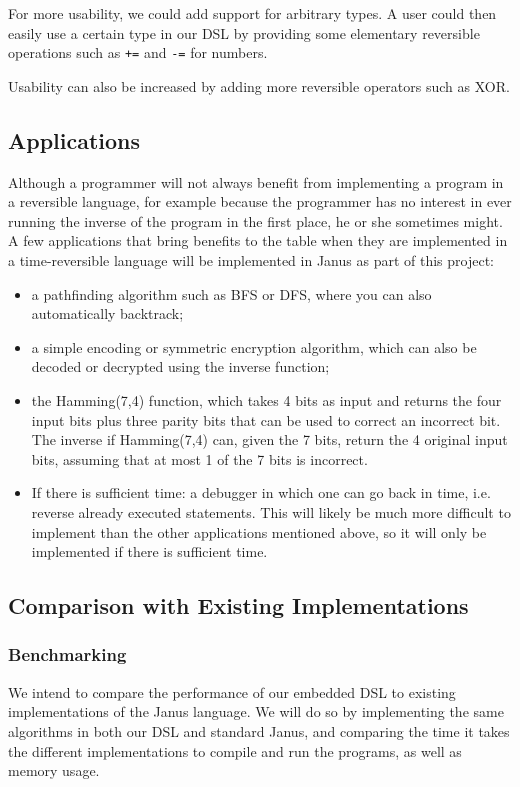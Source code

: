 \documentclass[12pt,a4paper]{article}
\begin{document}
	For more usability, we could add support for arbitrary types. A user could then easily use a certain type in our DSL by providing some elementary reversible operations such as \texttt{+=} and \texttt{-=} for numbers.
	
	Usability can also be increased by adding more reversible operators such as XOR.

	\subsection{Applications}
	Although a programmer will not always benefit from implementing a program in a reversible language, for example because the programmer has no interest in ever running the inverse of the program in the first place, he or she sometimes might. A few applications that bring benefits to the table when they are implemented in a time-reversible language will be implemented in Janus as part of this project:
	\begin{itemize}
		\item
			a pathfinding algorithm such as BFS or DFS, where you can also automatically backtrack;
	        \item
	        		a simple encoding or symmetric encryption algorithm, which can also be decoded or decrypted using the inverse function;
	        	\item
			the Hamming(7,4) function, which takes 4 bits as input and returns the four input bits plus three parity bits that can be used to correct an incorrect bit\cite{hamming1950error}. The inverse if Hamming(7,4) can, given the 7 bits, return the 4 original input bits, assuming that at most 1 of the 7 bits is incorrect.
        		\item
			If there is sufficient time: a debugger in which one can go back in time, i.e. reverse already executed statements. This will likely be much more difficult to implement than the other applications mentioned above, so it will only be implemented if there is sufficient time.
	\end{itemize}
	
	\subsection{Comparison with Existing Implementations}
    \subsubsection{Benchmarking}
    We intend to compare the performance of our embedded DSL to existing implementations of the Janus language. We will do so by implementing the same algorithms in both our DSL and standard Janus, and comparing the time it takes the different implementations to compile and run the programs, as well as memory usage.
\end{document}
